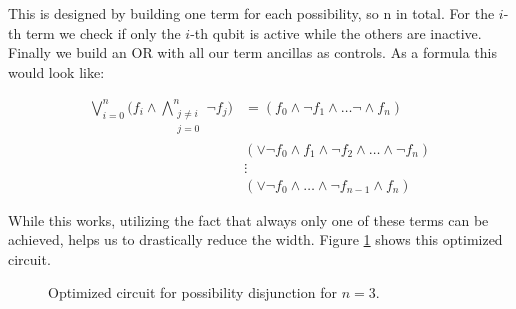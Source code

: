 \begin{description}
    This is designed by building one term for each possibility, so n in total. For the $i$-th term we check if only the $i$-th qubit is active while the others are inactive.
    Finally we build an OR with all our term ancillas as controls. 
    As a formula this would look like:

    \begin{align}
        \bigvee_{i=0}^n \bigl( f_i \land \bigwedge_{\substack{j\neq i \\ j=0}}^{n}\lnot f_j\bigr) &= \left( f_0 \land \lnot f_1 \land \dots \lnot \land f_n \right) \nonumber\\
        & \left( \lor\lnot f_0 \land f_1 \land \lnot f_2 \land \dots \land \lnot f_n \right) \nonumber\\
        &\vdots\nonumber\\
        &\left( \lor\lnot f_0 \land \dots \land \lnot f_{n-1} \land f_n \right)
    \end{align}

    While this works, utilizing the fact that always only one of these terms can be achieved, helps us to drastically reduce the width. Figure \ref{fig:bg:thesis:xor-disjunction-circuit} shows this optimized circuit.

    \begin{figure}[H]
        \centering
        \caption{Optimized circuit for possibility disjunction for $n=3$.}
        \label{fig:bg:thesis:xor-disjunction-circuit}
    \end{figure}
    
    
\end{description}